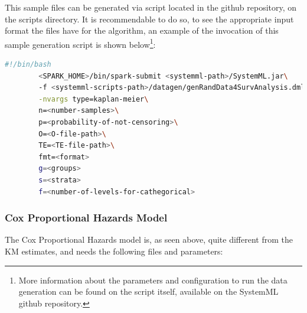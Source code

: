 \documentclass[11pt]{book} %
\begin{document}
      This sample files can be generated via script located in the github repository, on the scripts directory. It is recommendable to do so, to see the appropriate input format the files have for the algorithm, an example of the invocation of this sample generation script is shown below\footnote{More information about the parameters and configuration to run the data generation can be found on the script itself, available on the SystemML github repository.}:

      \begin{lstlisting}[label=data-generation-invocation, language=sh, caption=Sample invocation of the data generation script]
        #!/bin/bash
        <SPARK_HOME>/bin/spark-submit <systemml-path>/SystemML.jar\
        -f <systemml-scripts-path>/datagen/genRandData4SurvAnalysis.dml\
        -nvargs type=kaplan-meier\
        n=<number-samples>\
        p=<probability-of-not-censoring>\
        O=<O-file-path>\
        TE=<TE-file-path>\
        fmt=<format>
        g=<groups>
        s=<strata>
        f=<number-of-levels-for-cathegorical>
      \end{lstlisting}

\newpage

    \subsubsection{Cox Proportional Hazards Model}

      The Cox Proportional Hazards model is, as seen above, quite different from the KM estimates, and needs the following files and parameters:
\end{document}
